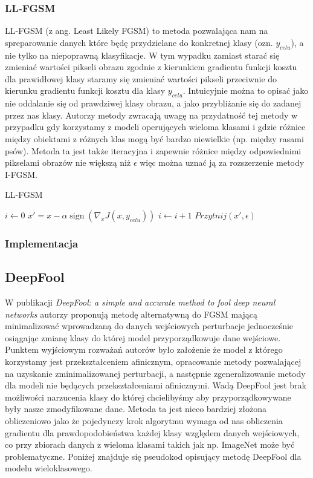 \documentclass{article}
\begin{document}
    \subsubsection{LL-FGSM}
    LL-FGSM (z ang. Least Likely FGSM) to metoda pozwalająca nam na spreparowanie danych które będę przydzielane do
    konkretnej klasy (ozn. $y_{celu}$), a nie tylko na niepoprawną klasyfikacje. W tym wypadku zamiast starać się
    zmieniać wartości pikseli obrazu zgodnie z kierunkiem gradientu funkcji kosztu dla prawidłowej klasy
    staramy się zmieniać wartości pikseli przeciwnie do kierunku gradientu funkcji kosztu dla klasy $y_{celu}$.
    Intuicyjnie można to opisać jako nie oddalanie się od prawdziwej klasy obrazu, a jako przybliżanie się do zadanej
    przez nas klasy.
    Autorzy metody zwracają uwagę na przydatność tej metody
    w przypadku gdy korzystamy z modeli operujących wieloma klasami i gdzie różnice między obiektami z różnych klas mogą
    być bardzo niewielkie (np. między rasami psów). Metoda ta jest także iteracyjna i zapewnie różnice między
    odpowiednimi pikselami obrazów nie większą niż $\epsilon$ więc można uznać ją za rozszerzenie metody I-FGSM.

    \begin{algorithm}
    \caption{LL-FGSM}\label{LLFGSM}
    \begin{algorithmic}[1]
    \State $i \gets 0$
        \State $x' = x - \alpha\operatorname{sign}(\nabla_{x} J(x, y_{celu}))$
        \State $i \gets i+1$
        \State $Przytnij(x', \epsilon)$
    \EndWhile
    \end{algorithmic}
    \end{algorithm}

\subsubsection{Implementacja}

\subsection{DeepFool}
W publikacji \textit{DeepFool: a simple and accurate method to fool deep neural networks}\cite{DBLP:journals/corr/Moosavi-Dezfooli15}
autorzy proponują metodę alternatywną do FGSM mającą minimalizować wprowadzaną do danych wejściowych perturbacje jednocześnie
osiągając zmianę klasy do której model przyporządkowuje dane wejściowe. Punktem wyjściowym rozważań autorów było założenie
że model z którego korzystamy jest przekształceniem afinicznym, opracowanie metody pozwalającej na
uzyskanie zminimalizowanej perturbacji, a następnie zgeneralizowanie metody dla modeli nie będących przekształceniami afinicznymi.
Wadą DeepFool jest brak możliwości narzucenia klasy do której chcielibyśmy aby przyporządkowywane były nasze zmodyfikowane dane.
Metoda ta jest nieco bardziej złożona obliczeniowo jako że pojedynczy krok algorytmu wymaga od nas obliczenia gradientu dla
prawdopodobieństwa każdej klasy względem danych wejściowych, co przy zbiorach danych z wieloma klasami
takich jak np. ImageNet może być problematyczne. Poniżej znajduje się pseudokod opisujący metodę DeepFool dla modelu
wieloklasowego.
\end{document}
